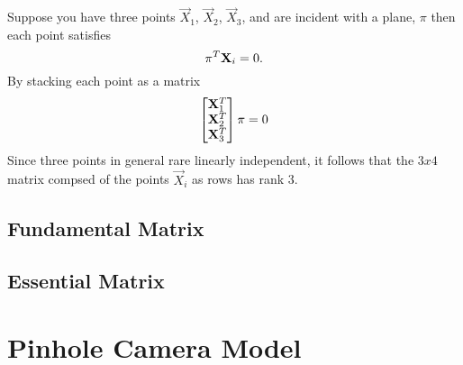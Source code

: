 Suppose you have three points $\Vec{X}_{1}$, $\Vec{X}_{2}$, $\Vec{X}_{3}$, and
are incident with a plane, $\pi$ then each point satisfies
%
\begin{equation}
  {{\pi^{T}}} {\mathbf{X}}_{i} = 0.
\end{equation}
%
By stacking each point as a matrix
%
\begin{align}
  \begin{bmatrix}
    {{{\mathbf{X}}_{1}^{T}}} \\
    {{{\mathbf{X}}_{2}^{T}}} \\
    {{{\mathbf{X}}_{3}^{T}}}
  \end{bmatrix} \pi = 0
\end{align}
%
Since three points in general rare linearly independent, it follows that the
$3x4$ matrix compsed of the points $\Vec{X}_{i}$ as rows has rank 3.


\subsection{Fundamental Matrix}

\subsection{Essential Matrix}



\section{Pinhole Camera Model}

